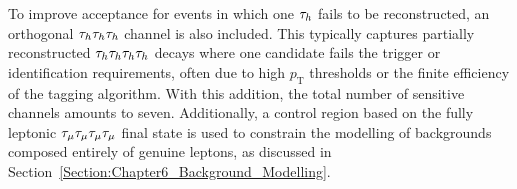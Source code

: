 
To improve acceptance for events in which one $\tau_h$ fails to be reconstructed, an orthogonal $\tau_h\tau_h\tau_h$ channel is also included. This typically captures partially reconstructed $\tau_h\tau_h\tau_h\tau_h$ decays where one candidate fails the trigger or identification requirements, often due to high $p_\text{T}$ thresholds or the finite efficiency of the tagging algorithm. With this addition, the total number of sensitive channels amounts to seven. Additionally, a control region based on the fully leptonic $\tau_{\mu} \tau_{\mu} \tau_{\mu} \tau_{\mu}$ final state is used to constrain the modelling of backgrounds composed entirely of genuine leptons, as discussed in Section~\ref{Section:Chapter6_Background_Modelling}.

